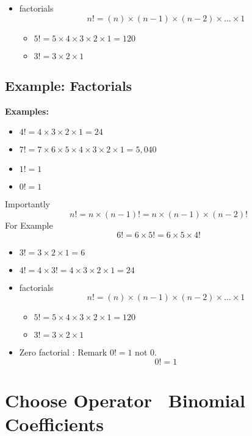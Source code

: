 \documentclass[]{report}
\begin{document}
\begin{itemize}

	
	\item factorials 
	\[ n! = (n)\times (n-1)\times(n-2) \times \ldots \times 1 \]
	\begin{itemize}
		\item $5! = 5 \times 4 \times 3 \times 2 \times 1 = 120 $
		\item $3! = 3 \times 2 \times 1$
	\end{itemize}
\end{itemize}	


\newpage
	\subsection{Example: Factorials }
	
	\noindent \textbf{Examples:}
	
	\begin{itemize}
		\item $4! = 4 \times 3 \times 2 \times 1 = 24$
		\item $7! = 7 \times 6 \times 5 \times 4 \times 3 \times 2 \times 1 = 5,040$
		\item $1! = 1$
		\item $0! = 1 $
	\end{itemize}
	Importantly 
	\[n! = n \times (n-1)!  = n \times (n-1) \times (n-2)! \]
	For Example
	\[6! = 6 \times 5!  = 6 \times 5 \times 4! \]
	
	
	
	\begin{itemize}
		\item $3!  = 3 \times 2  \times 1 = 6 $
		
		\item $4!  = 4 \times 3! = 4 \times 3 \times 2 \times 1 = 24$
		
		\item factorials 
		\[ n! = (n)\times (n-1)\times(n-2) \times \ldots \times 1 \]
		\begin{itemize}
			\item $5! = 5 \times 4 \times 3 \times 2 \times 1 = 120 $
			\item $3! = 3 \times 2 \times 1$
		\end{itemize}
		\item Zero factorial : Remark $0! = 1$ not $0$.
		\[ 0! =  1 \]
	\end{itemize}
	

\section{Choose Operator \ Binomial Coefficients}
\end{document}
